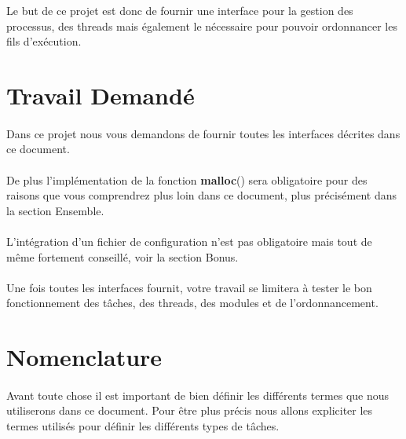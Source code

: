 \documentclass[10pt,a4wide]{article}
\begin{document}
Le but de ce projet est donc de fournir une interface pour la gestion
des processus, des threads mais \'egalement le n\'ecessaire pour pouvoir
ordonnancer les fils d'ex\'ecution.

\section{Travail Demand\'e}

\paragraph{}

Dans ce projet nous vous demandons de fournir toutes les interfaces d\'ecrites
dans ce document.

\paragraph{}

De plus l'impl\'ementation de la fonction \textbf{malloc}() sera
obligatoire pour des raisons que vous comprendrez plus loin dans ce document,
plus pr\'ecis\'ement dans la section Ensemble.

\paragraph{}

L'int\'egration d'un fichier de configuration n'est pas obligatoire mais
tout de m\^eme fortement conseill\'e, voir la section Bonus.

\paragraph{}

Une fois toutes les interfaces fournit, votre travail se limitera \`a
tester le bon fonctionnement des t\^aches, des threads, des modules
et de l'ordonnancement.

\section{Nomenclature}

\paragraph{}

Avant toute chose il est important de bien d\'efinir les diff\'erents
termes que nous utiliserons dans ce document. Pour \^etre plus pr\'ecis
nous allons expliciter les termes utilis\'es pour d\'efinir les
diff\'erents types de t\^aches.
\end{document}
